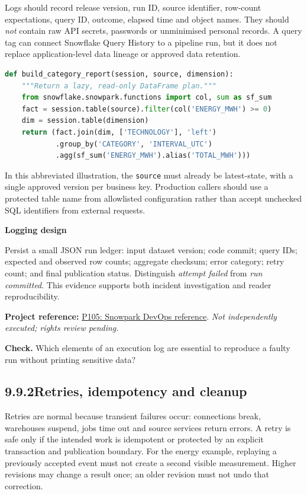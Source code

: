 \documentclass[11pt,twoside]{article}
\newcommand{\topic}[2]{\subsection*{#1\quad #2}}
\newcommand{\repo}[2]{\par\begingroup\fontsize{8.0}{9.6}\selectfont\sffamily\color{inkgray}\textbf{Project reference:} \href{#2}{#1}. \textit{Not independently executed; rights review pending.}\par\endgroup}
\begin{document}
Logs should record release version, run ID, source identifier, row-count expectations, query ID, outcome, elapsed time and object names. They should \emph{not} contain raw API secrets, passwords or unminimised personal records. A query tag can connect Snowflake Query History to a pipeline run, but it does not replace application-level data lineage or approved data retention.
\begin{lstlisting}[language=Python,caption={An original, testable function boundary.}]
def build_category_report(session, source, dimension):
    """Return a lazy, read-only DataFrame plan."""
    from snowflake.snowpark.functions import col, sum as sf_sum
    fact = session.table(source).filter(col('ENERGY_MWH') >= 0)
    dim = session.table(dimension)
    return (fact.join(dim, ['TECHNOLOGY'], 'left')
            .group_by('CATEGORY', 'INTERVAL_UTC')
            .agg(sf_sum('ENERGY_MWH').alias('TOTAL_MWH')))
\end{lstlisting}
In this abbreviated illustration, the \texttt{source} must already be latest-state, with a single approved version per business key. Production callers should use a protected table name from allowlisted configuration rather than accept unchecked SQL identifiers from external requests.
\begin{whitebox}\textbf{Logging design}\par
Persist a small JSON run ledger: input dataset version; code commit; query IDs; expected and observed row counts; aggregate checksum; error category; retry count; and final publication status. Distinguish \emph{attempt failed} from \emph{run committed}. This evidence supports both incident investigation and reader reproducibility.\end{whitebox}
\repo{P105: Snowpark DevOps reference}{https://github.com/Snowflake-Labs/snowpark-devops}
\textbf{Check.} Which elements of an execution log are essential to reproduce a faulty run without printing sensitive data?
\newpage
\topic{9.9.2}{Retries, idempotency and cleanup}
Retries are normal because transient failures occur: connections break, warehouses suspend, jobs time out and source services return errors. A retry is safe only if the intended work is idempotent or protected by an explicit transaction and publication boundary. For the energy example, replaying a previously accepted event must not create a second visible measurement. Higher revisions may change a result once; an older revision must not undo that correction.
\end{document}
